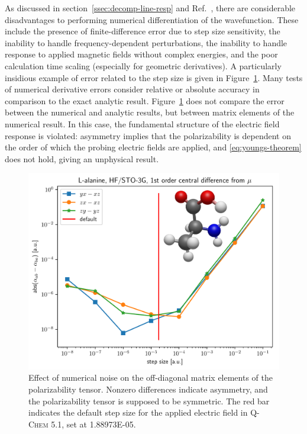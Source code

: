 \documentclass[%
class = book,%
crop = false,%
float = true,%
multi = true,%
preview = false,%
]{standalone}
\newcommand\qchem{\textsc{Q-Chem}}
\begin{document}
As discussed in section~\ref{ssec:decomp-line-resp} and Ref.~\parencite{gauss2000}, there are considerable disadvantages to performing numerical differentiation of the wavefunction. These include the presence of finite-difference error due to step size sensitivity, the inability to handle frequency-dependent perturbations, the inability to handle response to applied magnetic fields without complex energies, and the poor calculation time scaling (especially for geometric derivatives). A particularly insidious example of error related to the step size is given in Figure~\ref{fig:finite-difference-numerical-noise}. Many tests of numerical derivative errors consider relative or absolute accuracy in comparison to the exact analytic result. Figure~\ref{fig:finite-difference-numerical-noise} does not compare the error between the numerical and analytic results, but between matrix elements of the numerical result. In this case, the fundamental structure of the electric field response is violated: asymmetry implies that the polarizability is dependent on the order of which the probing electric fields are applied, and \eqref{eq:youngs-theorem} does not hold, giving an unphysical result.

\begin{figure}
  \centering
  \includegraphics[width=\textwidth]{./diff_overlay.pdf}
  \caption[Asymmetry in the 1st-order finite-difference polarizability]{Effect of numerical noise on the off-diagonal matrix elements of the polarizability tensor. Nonzero differences indicate asymmetry, and the polarizability tensor is supposed to be symmetric. The red bar indicates the default step size for the applied electric field in \qchem{} 5.1, set at \SI{1.88973E-05}{\au}.\label{fig:finite-difference-numerical-noise}}
\end{figure}
\end{document}
